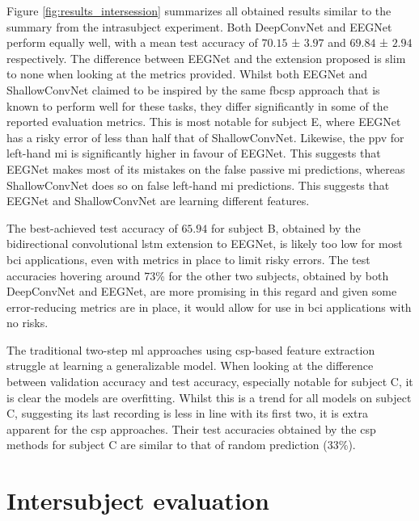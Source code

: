 Figure \ref{fig:results_intersession} summarizes all obtained results similar to the summary from the intrasubject experiment.
Both DeepConvNet and EEGNet perform equally well, with a mean test accuracy of $70.15$ ± $3.97$ and $69.84$ ± $2.94$ respectively.
The difference between EEGNet and the extension proposed is slim to none when looking at the metrics provided. 
Whilst both EEGNet and ShallowConvNet claimed to be inspired by the same \gls{fbcsp} approach that is known to perform well for these tasks, they differ significantly in some of the reported evaluation metrics.
This is most notable for subject E, where EEGNet has a risky error of less than half that of ShallowConvNet.
Likewise, the \gls{ppv} for left-hand \gls{mi} is significantly higher in favour of EEGNet.
This suggests that EEGNet makes most of its mistakes on the false passive \gls{mi} predictions, whereas ShallowConvNet does so on false left-hand \gls{mi} predictions.
This suggests that EEGNet and ShallowConvNet are learning different features.

The best-achieved test accuracy of $65.94$ for subject B, obtained by the bidirectional convolutional \gls{lstm} extension to EEGNet, is likely too low for most \gls{bci} applications, even with metrics in place to limit risky errors.
The test accuracies hovering around 73\% for the other two subjects, obtained by both DeepConvNet and EEGNet, are more promising in this regard and given some error-reducing metrics are in place, it would allow for use in \gls{bci} applications with no risks.

The traditional two-step \gls{ml} approaches using \gls{csp}-based feature extraction struggle at learning a generalizable model.
When looking at the difference between validation accuracy and test accuracy, especially notable for subject C, it is clear the models are overfitting.
Whilst this is a trend for all models on subject C, suggesting its last recording is less in line with its first two, it is extra apparent for the \gls{csp} approaches.
Their test accuracies obtained by the \gls{csp} methods for subject C are similar to that of random prediction (33\%).



\section{Intersubject evaluation}
\label{sec:evaluation_intersubject}


